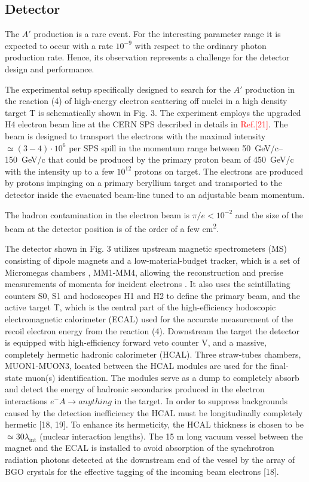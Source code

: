\subsection{Detector}

The $A'$ production is a rare event. For the interesting parameter range it is expected to occur with a rate $10^{-9}$
with respect to the ordinary photon production rate. Hence, its observation represents a challenge for the detector
design and performance.\par

The experimental setup specifically designed to search for the $A'$ production in the reaction (4) of high-energy
electron scattering off nuclei in a high density target T is schematically shown in Fig. 3. The experiment employs the
upgraded H4 electron beam line at the CERN SPS described in details in \textcolor{red}{Ref.[21]}. The beam is designed
to transport the electrons with the maximal intensity $\simeq (3-4) \cdot 10^6$ per SPS spill in the momentum range
between \SIrange{50}{150}{GeV/c} that could be produced by the primary proton beam of \SI{450}{GeV/c} with the intensity
up to a few $10^{12}$ protons on target. The electrons are produced by protons impinging on a primary beryllium target and
transported to the detector inside the evacuated beam-line tuned to an adjustable beam momentum. \par

The hadron contamination in the electron beam is $\pi/e < 10^{-2}$ and the size of the beam at the detector position is
of the order of a few \si{\square\centi\metre}.

The detector shown in Fig. 3 utilizes upstream magnetic spectrometers (MS) consisting of dipole magnets and a
low-material-budget tracker, which is a set of Micromegas chambers , MM1-MM4, allowing the reconstruction and precise
measurements of momenta for incident electrons \cite{mm}. It also uses the scintillating counters S0, S1 and hodoscopes H1
and H2 to define the primary beam, and the active target T, which is the central part of the high-efficiency hodoscopic
electromagnetic calorimeter (ECAL) used for the accurate measurement of the recoil electron energy from the reaction
(4). Downstream the target the detector is equipped with high-efficiency forward veto counter V, and a massive,
completely hermetic hadronic calorimeter (HCAL). Three straw-tubes chambers, MUON1-MUON3, located between the HCAL
modules are used for the final-state muon(s) identification. The modules serve as a dump to completely absorb and detect
the energy of hadronic secondaries produced in the electron interactions $e^-A\rightarrow anything$ in the target. In
order to suppress backgrounds caused by the detection inefficiency the HCAL must be longitudinally completely hermetic
[18, 19]. To enhance its hermeticity, the HCAL thickness is chosen to be $\simeq  30 \lambda_{\mathrm{int}}$ (nuclear
interaction lengths). The 15 m long vacuum vessel between the magnet and the ECAL is installed to avoid absorption of
the synchrotron radiation photons detected at the downstream end of the vessel by the array of BGO crystals for the
effective tagging of the incoming beam electrons [18].





